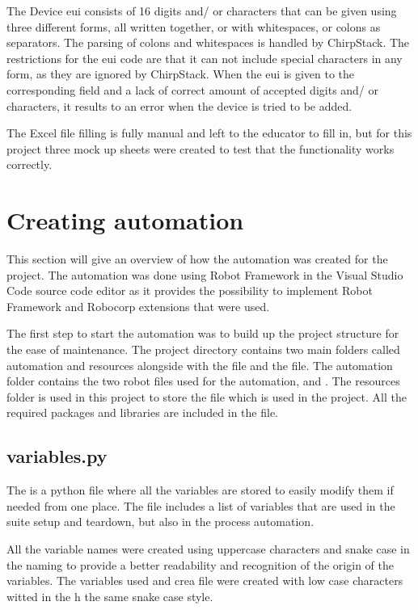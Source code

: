 The Device \gls{eui} consists of 16 digits and/ or characters that can be given using three different forms, all written together, or with whitespaces, or colons as separators.
The parsing of colons and whitespaces is handled by ChirpStack.
The restrictions for the \gls{eui} code are that it can not include special characters in any form, as they are ignored by ChirpStack.
When the \gls{eui} is given to the corresponding field and a lack of correct amount of accepted digits and/ or characters, it results to an error when the device is tried to be added.

The Excel file filling is fully manual and left to the educator to fill in, but for this project three mock up sheets were created to test that the functionality works correctly.

\section{Creating automation}
This section will give an overview of how the automation was created for the project.
The automation was done using Robot Framework in the Visual Studio Code source code editor as it provides the possibility to implement Robot Framework and Robocorp extensions that were used.

The first step to start the automation was to build up the project structure for the ease of maintenance.
The project directory contains two main folders called automation and resources alongside with the  file and the  file.
The automation folder contains the two robot files used for the automation,  and .
The resources folder is used in this project to store the  file which is used in the project.
All the required packages and libraries are included in the  file.

\subsection{variables.py}
The  is a python file where all the variables are stored to easily modify them if needed from one place.
The  file includes a list of variables that are used in the suite setup and teardown, but also in the process automation.

All the variable names were created using uppercase characters and snake case in the naming to provide a better readability and recognition of the origin of the variables.
The variables used and crea file were created with low case characters witted in the h the same snake case style.

